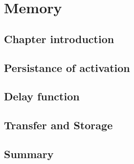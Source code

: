 \chapter{Memory}
\minitoc
\section{Chapter introduction}
\section{Persistance of activation}
\section{Delay function}
\section{Transfer and Storage}
\section{Summary}
